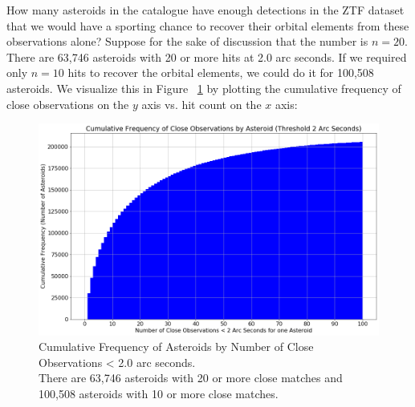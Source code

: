 How many asteroids in the catalogue have enough detections in the ZTF dataset that we would have 
a sporting chance to recover their orbital elements from these observations alone?
Suppose for the sake of discussion that the number is $n=20$.
There are 63,746 asteroids with 20 or more hits at 2.0 arc seconds.
If we required only $n=10$ hits to recover the orbital elements, we could do it for 100,508 asteroids.
We visualize this in Figure ~\ref{fig:ztf_cum_hit_freq} by plotting the cumulative frequency of close observations on the $y$ axis vs. hit count on the $x$ axis:
\begin{figure}[hbt!]
\begin{center}
\includegraphics[width=1.0\textwidth]{../figs/ztf/nearest_ast_cum.png}
\end{center}
\caption[Cumulative Frequency of Asteroids by Number of Hits < 2.0 arc seconds]
{Cumulative Frequency of Asteroids by Number of Close Observations < 2.0 arc seconds. \\
There are 63,746 asteroids with 20 or more close matches and 100,508 asteroids with 10 or more close matches. }
\label{fig:ztf_cum_hit_freq}
\end{figure}

